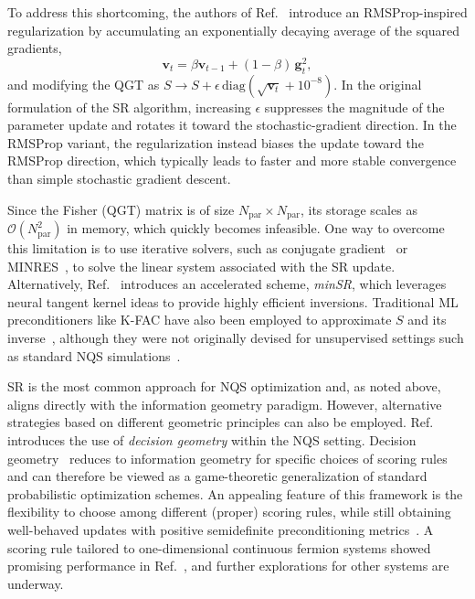 To address this shortcoming, the authors of Ref.~\cite{lovato_hidden-nucleons_2022} introduce an RMSProp-inspired regularization by accumulating an exponentially decaying average of the squared gradients,
\begin{equation}
\mathbf{v}_t = \beta \mathbf{v}_{t-1} + (1 - \beta)\,\mathbf{g}_t^2 ,
\label{eq:sr_rmsprop}
\end{equation}
and modifying the QGT as $S \to S + \epsilon\,\mathrm{diag}\!\left(\sqrt{\mathbf{v}_t}+10^{-8}\right)$. In the original formulation of the SR algorithm, increasing $\epsilon$ suppresses the magnitude of the parameter update and rotates it toward the stochastic-gradient direction. In the RMSProp variant, the regularization instead biases the update toward the RMSProp direction, which typically leads to faster and more stable convergence than simple stochastic gradient descent.


Since the Fisher (QGT) matrix is of size $N_\text{par}\!\times\! N_\text{par}$, its storage scales as $\mathcal{O}(N_\text{par}^2)$ in memory, which quickly becomes infeasible. One way to overcome this limitation is to use iterative solvers, such as conjugate gradient~\cite{neuscamman_optimizing_2012} or MINRES~\cite{drissi_second-order_2024}, to solve the linear system associated with the SR update. Alternatively, Ref.~\cite{chen_empowering_2024} introduces an accelerated scheme, \emph{minSR}, which leverages neural tangent kernel ideas to provide highly efficient inversions. Traditional ML preconditioners like K-FAC have also been employed to approximate $S$ and its inverse~\cite{pfau_ab_2020}, although they were not originally devised for unsupervised settings such as standard NQS simulations~\cite{drissi_second-order_2024}.

SR is the most common approach for NQS optimization and, as noted above, aligns directly with the information geometry paradigm. However, alternative strategies based on different geometric principles can also be employed. Ref.~\cite{drissi_second-order_2024} introduces the use of \emph{decision geometry} within the NQS setting. Decision geometry~\cite{dawid_geometry_2007} reduces to information geometry for specific choices of scoring rules and can therefore be viewed as a game-theoretic generalization of standard probabilistic optimization schemes. An appealing feature of this framework is the flexibility to choose among different (proper) scoring rules, while still obtaining well-behaved updates with positive semidefinite preconditioning metrics~\cite{parry_proper_2012}. A scoring rule tailored to one-dimensional continuous fermion systems showed promising performance in Ref.~\cite{drissi_second-order_2024}, and further explorations for other systems are underway.


